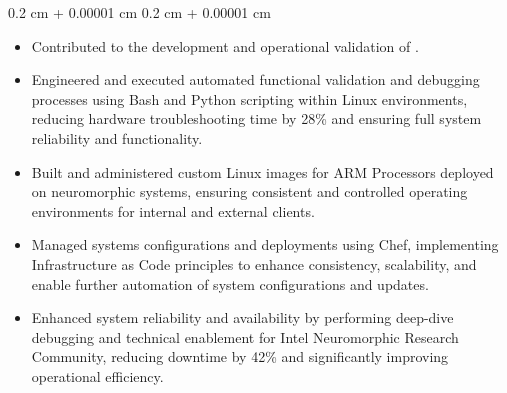 \documentclass[10pt, letterpaper]{article}
\newenvironment{highlights}{
    \begin{itemize}[
        topsep=0.10 cm,
        parsep=0.10 cm,
        partopsep=0pt,
        itemsep=0pt,
        leftmargin=0.4 cm + 10pt
    ]
}{
    \end{itemize}
} %
\newenvironment{onecolentry}{
    \begin{adjustwidth}{
        0.2 cm + 0.00001 cm
    }{
        0.2 cm + 0.00001 cm
    }
}{
    \end{adjustwidth}
} %
\let\hrefWithoutArrow\href
\renewcommand{\href}[2]{\hrefWithoutArrow{#1}{\ifthenelse{\equal{#2}{}}{ }{#2 }\raisebox{.15ex}{\footnotesize \faExternalLink*}}}
\begin{document}
    \vspace{0.10 cm}
    \begin{onecolentry}
        \begin{highlights}
            \item Contributed to the development and operational validation of \href{https://newsroom.intel.com/artificial-intelligence/intel-builds-worlds-largest-neuromorphic-system-to-enable-more-sustainable-ai}{Hala Point}. %
            
            \item Engineered and executed automated functional validation and debugging processes using Bash and Python scripting within Linux environments, reducing hardware troubleshooting time by 28\% and ensuring full system reliability and functionality. %
            
            \item Built and administered custom Linux images for ARM Processors deployed on neuromorphic systems, ensuring consistent and controlled operating environments for internal and external clients. %
            
             \item Managed systems configurations and deployments using Chef, implementing Infrastructure as Code principles to enhance consistency, scalability, and enable further automation of system configurations and updates. %
            
            \item Enhanced system reliability and availability by performing deep-dive debugging and technical enablement for Intel Neuromorphic Research Community, reducing downtime by 42\% and significantly improving operational efficiency. %
            
        \end{highlights}
    \end{onecolentry}
\end{document}

